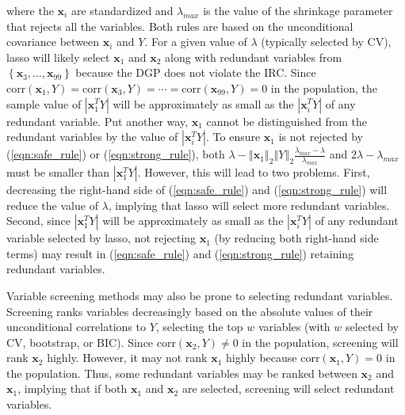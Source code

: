 \documentclass[11pt,review,authoryear]{elsarticle}
\begin{document}
where the $\mathbf{x}_i$ are standardized and $\lambda_{max}$ is the value of the shrinkage parameter that rejects all the variables. Both rules are based on the unconditional covariance between $\mathbf{x}_i$ and $Y$. For a given value of $\lambda$ (typically selected by CV), lasso will likely select $\mathbf{x}_1$ and $\mathbf{x}_2$ along with redundant variables from $\left\{ \mathbf{x}_3, \ldots, \mathbf{x}_{99} \right\}$ because the DGP does not violate the IRC. Since $\mathrm{corr} \left( \mathbf{x}_1, Y \right) = \mathrm{corr} \left( \mathbf{x}_3, Y \right) =  \cdots = \mathrm{corr} \left( \mathbf{x}_{99}, Y \right) = 0$ in the population, the sample value of $\left\vert \mathbf{x}_1^T Y \right\vert$ will be approximately as small as the $\left\vert \mathbf{x}_i^T Y \right\vert$ of any redundant variable. Put another way, $\mathbf{x}_1$ cannot be distinguished from the redundant variables by the value of $\left\vert \mathbf{x}_i^T Y \right\vert$. To ensure $\mathbf{x}_1$ is not rejected by (\ref{eqn:safe_rule}) or (\ref{eqn:strong_rule}), both $\lambda - \left\Vert \mathbf{x}_1 \right\Vert_2 \left\Vert Y \right\Vert_2 \frac{\lambda_{max} - \lambda} {\lambda_{max}}$ and $2\lambda - \lambda_{max}$ must be smaller than $\left\vert \mathbf{x}_1^T Y \right\vert$. However, this will lead to two problems. First, decreasing the right-hand side of (\ref{eqn:safe_rule}) and (\ref{eqn:strong_rule}) will reduce the value of $\lambda$, implying that lasso will select more redundant variables. Second, since $\left\vert \mathbf{x}_1^T Y \right\vert$ will be approximately as small as the $\left\vert \mathbf{x}_i^T Y \right\vert$ of any redundant variable selected by lasso, not rejecting $\mathbf{x}_1$ (by reducing both right-hand side terms) may result in (\ref{eqn:safe_rule}) and (\ref{eqn:strong_rule}) retaining redundant variables.

Variable screening methods \citep{fan2008sure} may also be prone to selecting redundant variables. Screening ranks variables decreasingly based on the absolute values of their unconditional correlations to $Y$, selecting the top $w$ variables (with $w$ selected by CV, bootstrap, or BIC). Since $\mathrm{corr} \left( \mathbf{x}_2, Y \right) \neq 0$ in the population, screening will rank $\mathbf{x}_2$ highly. However, it may not rank $\mathbf{x}_1$ highly because $\mathrm{corr} \left( \mathbf{x}_1, Y \right) = 0$ in the population. Thus, some redundant variables may be ranked between $\mathbf{x}_2$ and $\mathbf{x}_1$, implying that if both $\mathbf{x}_1$ and $\mathbf{x}_2$ are selected, screening will select redundant variables.
\end{document}
